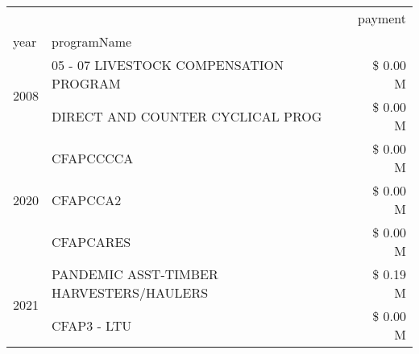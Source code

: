\begin{tabular}{llr}
\toprule
 &  & payment \\
year & programName &  \\
\midrule
\multirow[t]{2}{*}{2008} & 05 - 07 LIVESTOCK COMPENSATION PROGRAM & \$ 0.00 M \\
 & DIRECT AND COUNTER CYCLICAL PROG & \$ 0.00 M \\
\cline{1-3}
\multirow[t]{3}{*}{2020} & CFAPCCCCA & \$ 0.00 M \\
 & CFAPCCA2 & \$ 0.00 M \\
 & CFAPCARES & \$ 0.00 M \\
\cline{1-3}
\multirow[t]{2}{*}{2021} & PANDEMIC ASST-TIMBER HARVESTERS/HAULERS & \$ 0.19 M \\
 & CFAP3 - LTU & \$ 0.00 M \\
\cline{1-3}
\bottomrule
\end{tabular}
